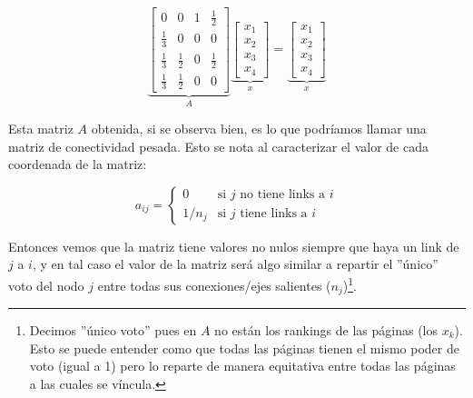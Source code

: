 \begin{equation}
    \underbrace{
        \begin{bmatrix}
                0& 0& 1& \frac{1}{2}\\[-0.65em]
                \frac{1}{3}& 0& 0& 0\\[-0.65em]
                \frac{1}{3}& \frac{1}{2}& 0& \frac{1}{2}\\[-0.65em]
                \frac{1}{3}& \frac{1}{2}& 0& 0
        \end{bmatrix}
    }_A
    \underbrace{
        \begin{bmatrix}
            x_1\\[-0.65em]
            x_2\\[-0.65em]
            x_3\\[-0.65em]
            x_4
        \end{bmatrix}
    }_x
    =
    \underbrace{
        \begin{bmatrix}
            x_1\\[-0.65em]
            x_2\\[-0.65em]
            x_3\\[-0.65em]
            x_4
        \end{bmatrix}
    }_x
\end{equation}

\par Esta matriz $A$ obtenida, si se observa bien, es lo que podr\'iamos llamar
una matriz de conectividad pesada. Esto se nota al caracterizar el valor de cada
coordenada de la matriz:

\begin{equation}
    a_{ij} =
    \begin{cases}
        0       &\text{si $j$ no tiene links a $i$}\\
        1/n_j   &\text{si $j$ tiene links a $i$}
    \end{cases}
\end{equation}

\par Entonces vemos que la matriz tiene valores no nulos siempre que haya un
link de $j$ a $i$, y en tal caso el valor de la matriz ser\'a algo similar a
repartir el ''\'unico'' voto del nodo $j$ entre todas sus conexiones/ejes
salientes ($n_j$)\footnote{Decimos ''\'unico voto'' pues en $A$ no est\'an los
rankings de las p\'aginas (los $x_k$). Esto se puede entender como que todas las
p\'aginas tienen el mismo poder de voto (igual a 1) pero lo reparte de manera
equitativa entre todas las p\'aginas a las cuales se v\'incula.}.
\medskip

